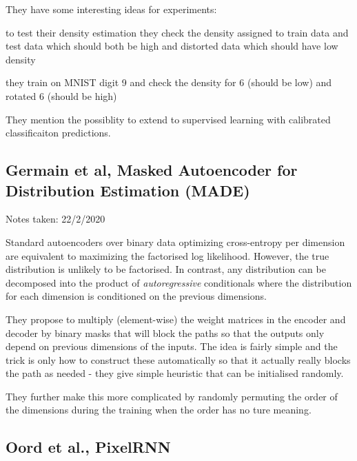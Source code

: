 They have some interesting ideas for experiments:
\begin{compactitem}
\item to test their density estimation they check the density assigned to train data and test data which should both be high and distorted data which should have low density
\item they train on MNIST digit 9 and check the density for 6 (should be low) and rotated 6 (should be high)
\end{compactitem}

They mention the possiblity to extend to supervised learning with calibrated classificaiton predictions.


\subsection{Germain et al, Masked Autoencoder for Distribution Estimation (MADE)}

\begin{notebox}

\hfill Notes taken: 22/2/2020 
\end{notebox}

Standard autoencoders over binary data optimizing cross-entropy per dimension are equivalent to maximizing the factorised log likelihood. However, the true distribution is unlikely to be factorised. In contrast, any distribution can be decomposed into the product of \emph{autoregressive} conditionals where the distribution for each dimension is conditioned on the previous dimensions.

They propose to multiply (element-wise) the weight matrices in the encoder and decoder by binary masks that will block the paths so that the outputs only depend on previous dimensions of the inputs. The idea is fairly simple and the trick is only how to construct these automatically so that it actually really blocks the path as needed - they give simple heuristic that can be initialised randomly.

They further make this more complicated by randomly permuting the order of the dimensions during the training when the order has no ture meaning.


\subsection{Oord et al., PixelRNN}

